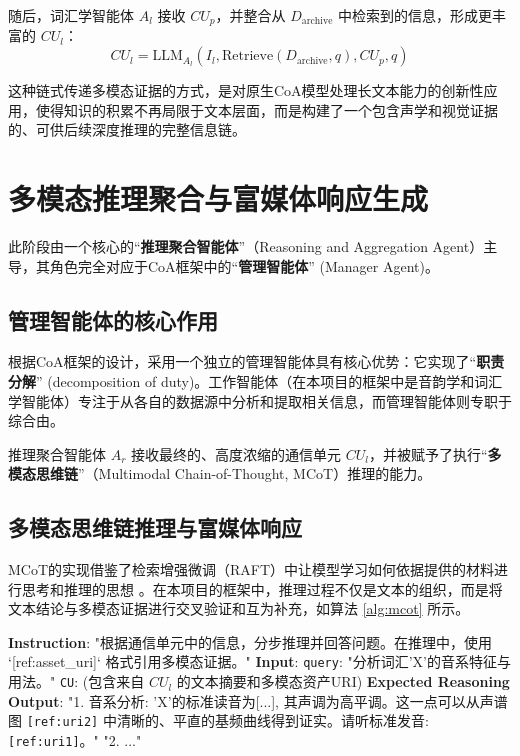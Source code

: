 随后，词汇学智能体 $A_l$ 接收 $CU_p$，并整合从 $D_{\text{archive}}$ 中检索到的信息，形成更丰富的 $CU_l$：
\begin{equation}
    CU_l = \text{LLM}_{A_l} (I_l, \text{Retrieve}(D_{\text{archive}}, q), CU_p, q)
    \label{eq:cu_l}
\end{equation}

这种链式传递多模态证据的方式，是对原生CoA模型处理长文本能力的创新性应用，使得知识的积累不再局限于文本层面，而是构建了一个包含声学和视觉证据的、可供后续深度推理的完整信息链。

\section{多模态推理聚合与富媒体响应生成}
此阶段由一个核心的“\textbf{推理聚合智能体}”（Reasoning and Aggregation Agent）主导，其角色完全对应于CoA框架中的“\textbf{管理智能体}” (Manager Agent)。

\subsection{管理智能体的核心作用}
根据CoA框架的设计，采用一个独立的管理智能体具有核心优势：它实现了“\textbf{职责分解}” (decomposition of duty)。工作智能体（在本项目的框架中是音韵学和词汇学智能体）专注于从各自的数据源中分析和提取相关信息，而管理智能体则专职于综合由。

推理聚合智能体 $A_r$ 接收最终的、高度浓缩的通信单元 $CU_l$，并被赋予了执行“\textbf{多模态思维链}”（Multimodal Chain-of-Thought, MCoT）推理的能力。

\subsection{多模态思维链推理与富媒体响应}
MCoT的实现借鉴了检索增强微调（RAFT）中让模型学习如何依据提供的材料进行思考和推理的思想 。在本项目的框架中，推理过程不仅是文本的组织，而是将文本结论与多模态证据进行交叉验证和互为补充，如算法 \ref{alg:mcot} 所示。

\begin{algorithm}[h!]
    \caption{多模态思维链（MCoT）推理提示模板}
    \label{alg:mcot}
    \small
    \begin{algorithmic}[1]
        \State \textbf{Instruction}: "根据通信单元中的信息，分步推理并回答问题。在推理中，使用 `[ref:asset\_uri]` 格式引用多模态证据。"
        \State \textbf{Input}:
        \State \quad \texttt{query}: "分析词汇'X'的音系特征与用法。"
        \State \quad \texttt{CU}: (包含来自 $CU_l$ 的文本摘要和多模态资产URI)
        \State \textbf{Expected Reasoning Output}:
        \State \quad "1. 音系分析: 'X'的标准读音为[...], 其声调为高平调。这一点可以从声谱图 \texttt{[ref:uri2]} 中清晰的、平直的基频曲线得到证实。请听标准发音: \texttt{[ref:uri1]}。"
        \State \quad "2. ..."
    \end{algorithmic}
\end{algorithm}

